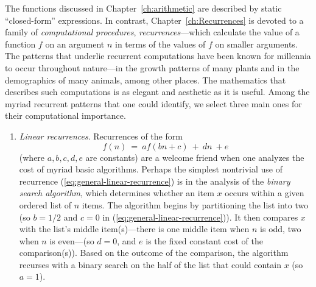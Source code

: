 The functions discussed in Chapter~\ref{ch:arithmetic} are described
by static ``closed-form'' expressions.  In contrast,
Chapter~\ref{ch:Recurrences} is devoted to a family of {\em
  computational procedures}, {\it recurrences}---which calculate the
value of a function $f$ on an argument $n$ in terms of the values of
$f$ on smaller arguments.  The patterns that underlie recurrent
computations have been known for millennia to occur throughout
nature---in the growth patterns of many plants and in the demographics
of many animals, among other places.  The mathematics that describes
such computations is as elegant and aesthetic as it is useful.  Among
the myriad recurrent patterns that one could identify, we select three
main ones for their computational importance.
\begin{enumerate}
\item
{\it Linear recurrences}.  Recurrences of the form
\begin{equation}
\label{eq:general-linear-recurrence}
f(n) \ = \ a f(bn+c) \ + \ dn \ + e
\end{equation}
(where $a, b, c, d, e$ are constants) are a welcome friend when one
analyzes the cost of myriad basic algorithms.  Perhaps the simplest
nontrivial use of recurrence (\ref{eq:general-linear-recurrence}) is
in the analysis of 
the {\em binary search algorithm}, which determines whether an item
$x$ occurs within a given ordered list of $n$ items.  The algorithm
begins by partitioning the list into two (so $b = 1/2$ and $c = 0$ in
(\ref{eq:general-linear-recurrence})).  It then compares $x$ with the
list's middle item(s)---there is one middle item when $n$ is odd, two
when $n$ is even---(so $d = 0$, and $e$ is the fixed constant cost of
the comparison(s)).  Based on the outcome of the comparison, the
algorithm recurses with a binary search on the half of the list that
could contain $x$ (so $a = 1$).



\end{enumerate}
